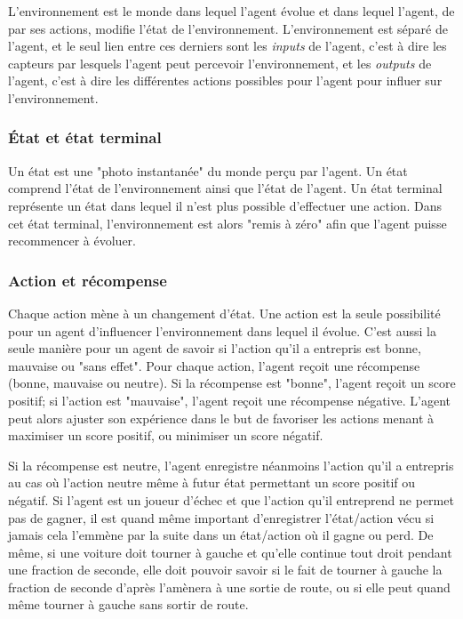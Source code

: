 \documentclass[11pt,a4paper]{report}
\begin{document}
    \par L'environnement est le monde dans lequel l'agent évolue et dans lequel l'agent, de par ses actions, modifie l'état de l'environnement. L'environnement est séparé de l'agent, et le seul lien entre ces derniers sont les \textit{inputs} de l'agent, c'est à dire les capteurs par lesquels l'agent peut percevoir l'environnement, et les \textit{outputs} de l'agent, c'est à dire les différentes actions possibles pour l'agent pour influer sur l'environnement. 
    
  \subsubsection{État et état terminal}
  
    \par Un état est une "photo instantanée" du monde perçu par l'agent. Un état comprend l'état de l'environnement ainsi que l'état de l'agent. Un état terminal représente un état dans lequel il n'est plus possible d'effectuer une action. Dans cet état terminal, l'environnement est alors "remis à zéro" afin que l'agent puisse recommencer à évoluer. 
  
   \subsubsection{Action et récompense}
  
    \par Chaque action mène à un changement d'état. Une action est la seule possibilité pour un agent d'influencer l'environnement dans lequel il évolue. C'est aussi la seule manière pour un agent de savoir si l'action qu'il a entrepris est bonne, mauvaise ou "sans effet". Pour chaque action, l'agent reçoit une récompense (bonne, mauvaise ou neutre). Si la récompense est "bonne", l'agent reçoit un score positif; si l'action est "mauvaise", l'agent reçoit une récompense négative. L'agent peut alors ajuster son expérience dans le but de favoriser les actions menant à maximiser un score positif, ou minimiser un score négatif.
    
    \par Si la récompense est neutre, l'agent enregistre néanmoins l'action qu'il a entrepris au cas où l'action neutre même à futur état permettant un score positif ou négatif. Si l'agent est un joueur d'échec et que l'action qu'il entreprend ne permet pas de gagner, il est quand même important d'enregistrer l'état/action vécu si jamais cela l’emmène par la suite dans un état/action où il gagne ou perd. De même, si une voiture doit tourner à gauche et qu'elle continue tout droit pendant une fraction de seconde, elle doit pouvoir savoir si le fait de tourner à gauche la fraction de seconde d'après l'amènera à une sortie de route, ou si elle peut quand même tourner à gauche sans sortir de route. 
    
\end{document}
